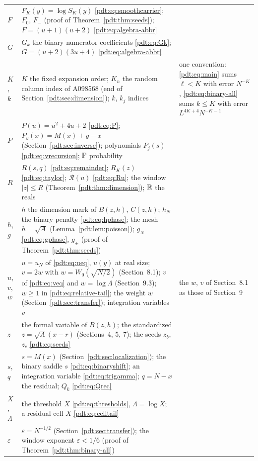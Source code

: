 \begin{writenote}
\begin{longtable}{@{}>{\raggedright\arraybackslash}p{0.55in}>{\raggedright\arraybackslash}p{3.7in}>{\raggedright\arraybackslash}p{1.9in}@{}}
$F$ & $F_K(y)=\log S_K(y)$ \eqref{pdt:eq:smoothcarrier}; $F_0$, $F_-$
 (proof of Theorem~\ref{pdt:thm:seeds}); $F=(u+1)(u+2)$
 \eqref{pdt:eq:algebra-abbr} & \\
$G$ & $G_k$ the binary numerator coefficients \eqref{pdt:eq:Gk};
 $G=(u+2)(3u+4)$ \eqref{pdt:eq:algebra-abbr} & \\
$K$, $k$ & $K$ the fixed expansion order; $K_n$ the random column index of
 A098568 (end of Section~\ref{pdt:sec:dimension}); $k$, $k_j$ indices &
 one convention: \eqref{pdt:eq:main} sums $\ell<K$ with error $N^{-K}$,
 \eqref{pdt:eq:binary-all} sums $k\le K$ with error $L^{4K+4}N^{-K-1}$\\
$P$ & $P(u)=u^2+4u+2$ \eqref{pdt:eq:P}; $P_y(x)=M(x)+y-x$
 (Section~\ref{pdt:sec:inverse}); polynomials $P_j(s)$
 \eqref{pdt:eq:vrecursion}; $\mathbb P$ probability & \\
$R$ & $R(s,q)$ \eqref{pdt:eq:remainder}; $R_K(z)$ \eqref{pdt:eq:taylor};
 $\mathcal R(u)$ \eqref{pdt:eq:Ru}; the window $|z|\le R$
 (Theorem~\ref{pdt:thm:dimension}); $\mathbb R$ the reals & \\
$h$, $g$ & $h$ the dimension mark of $B(z,h)$, $C(z,h)$; $h_N$ the binary
 penalty \eqref{pdt:eq:hphase}; the mesh $h=\sqrt A$
 (Lemma~\ref{pdt:lem:poisson}); $g_N$ \eqref{pdt:eq:gphase}, $g_\pm$
 (proof of Theorem~\ref{pdt:thm:seeds}) & \\
$u$, $v$, $w$ & $u=u_N$ of \eqref{pdt:eq:ueq}, $u(y)$ at real size; $v=2w$
 with $w=W_0(\sqrt{N/2})$ (Section~8.1); $v$ of \eqref{pdt:eq:veq} and
 $w=\log\Lambda$ (Section~9.3); $w\ge1$ in \eqref{pdt:eq:relative-tail};
 the weight $w$ (Section~\ref{pdt:sec:transfer}); integration variables $v$
 & the $w$, $v$ of Section~8.1 as those of Section~9\\
$z$ & the formal variable of $B(z,h)$; the standardized
 $z=\sqrt A(x-r)$ (Sections~4, 5, 7); the seeds $z_b$, $z_c$
 \eqref{pdt:eq:seeds} & \\
$s$, $q$ & $s=M(x)$ (Section~\ref{pdt:sec:localization}); the binary
 saddle $s$ \eqref{pdt:eq:binaryshift}; an integration variable
 \eqref{pdt:eq:trigamma}; $q=N-x$ the residual; $Q_k$ \eqref{pdt:eq:Qrec}
 & \\
$X$, $\Lambda$ & the threshold $X$ \eqref{pdt:eq:thresholds},
 $\Lambda=\log X$; a residual cell $X$ \eqref{pdt:eq:celltail} & \\
$\varepsilon$ & $\varepsilon=N^{-1/2}$ (Section~\ref{pdt:sec:transfer});
 the window exponent $\varepsilon<1/6$ (proof of
 Theorem~\ref{pdt:thm:binary-all}) & \\
\bottomrule
\end{longtable}
\endgroup


\end{writenote}
